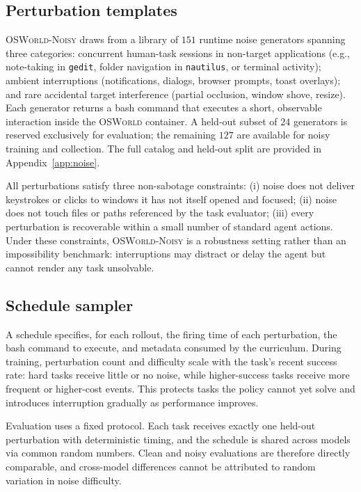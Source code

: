 \documentclass[11pt]{article}
\begin{document}
\subsection{Perturbation templates}
\label{sec:noise:library}

\textsc{OSWorld-Noisy} draws from a library of $151$ runtime noise
generators spanning three categories: concurrent human-task sessions
in non-target applications (e.g., note-taking in \texttt{gedit},
folder navigation in \texttt{nautilus}, or terminal activity); ambient
interruptions (notifications, dialogs, browser prompts, toast
overlays); and rare accidental target interference (partial occlusion,
window shove, resize). Each generator returns a bash command that
executes a short, observable interaction inside the \textsc{OSWorld}
container. A held-out subset of $24$ generators is reserved
exclusively for evaluation; the remaining $127$ are available for
noisy training and collection. The full catalog and held-out split
are provided in Appendix~\ref{app:noise}.

All perturbations satisfy three non-sabotage constraints: (i) noise
does not deliver keystrokes or clicks to windows it has not itself
opened and focused; (ii) noise does not touch files or paths
referenced by the task evaluator; (iii) every perturbation is
recoverable within a small number of standard agent actions. Under
these constraints, \textsc{OSWorld-Noisy} is a robustness setting
rather than an impossibility benchmark: interruptions may distract or
delay the agent but cannot render any task unsolvable.

\subsection{Schedule sampler}

A schedule specifies, for each rollout, the firing time of each
perturbation, the bash command to execute, and metadata consumed by
the curriculum. During training, perturbation count and difficulty
scale with the task's recent success rate: hard tasks receive little
or no noise, while higher-success tasks receive more frequent or
higher-cost events. This protects tasks the policy cannot yet solve
and introduces interruption gradually as performance improves.

Evaluation uses a fixed protocol. Each task receives exactly one
held-out perturbation with deterministic timing, and the schedule is
shared across models via common random numbers. Clean and noisy
evaluations are therefore directly comparable, and cross-model
differences cannot be attributed to random variation in noise
difficulty.
\end{document}
